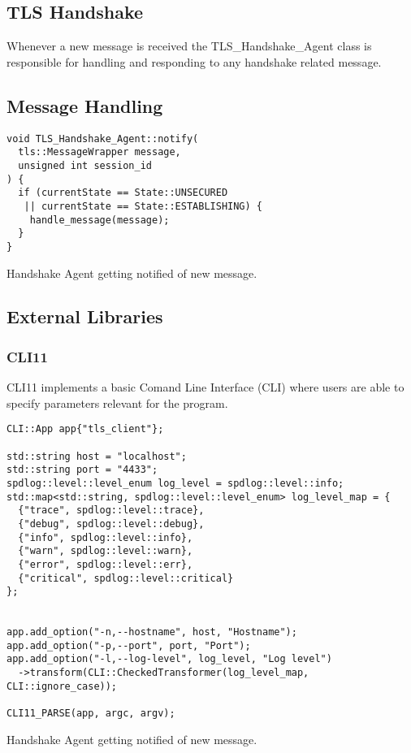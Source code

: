 \documentclass[12pt, letterpaper]{article}
\newenvironment{code}{\captionsetup{type=listing}}{}
\begin{document}

\subsection{TLS Handshake}
Whenever a new message is received the TLS\_Handshake\_Agent class is responsible for handling and responding to any handshake related message.

\subsection{Message Handling}

\begin{code}
	\begin{verbatim}
void TLS_Handshake_Agent::notify(
  tls::MessageWrapper message, 
  unsigned int session_id
) {
  if (currentState == State::UNSECURED 
   || currentState == State::ESTABLISHING) {
    handle_message(message);
  }
}
	\end{verbatim}
	\caption{Handshake Agent getting notified of new message.}
	\label{messageHandling}
\end{code}


\subsection{External Libraries}
\label{extBib}

\subsubsection{CLI11}
CLI11 implements a basic Comand Line Interface (CLI) where users are able to specify parameters relevant for the program. 

\begin{code}
	\begin{verbatim}
CLI::App app{"tls_client"};

std::string host = "localhost";
std::string port = "4433";
spdlog::level::level_enum log_level = spdlog::level::info;
std::map<std::string, spdlog::level::level_enum> log_level_map = {
  {"trace", spdlog::level::trace},
  {"debug", spdlog::level::debug},
  {"info", spdlog::level::info},
  {"warn", spdlog::level::warn},
  {"error", spdlog::level::err},
  {"critical", spdlog::level::critical}
};


app.add_option("-n,--hostname", host, "Hostname");
app.add_option("-p,--port", port, "Port");
app.add_option("-l,--log-level", log_level, "Log level")
  ->transform(CLI::CheckedTransformer(log_level_map, CLI::ignore_case));

CLI11_PARSE(app, argc, argv);
	\end{verbatim}
	\caption{Handshake Agent getting notified of new message.}
	\label{cli11}
\end{code}
\end{document}
